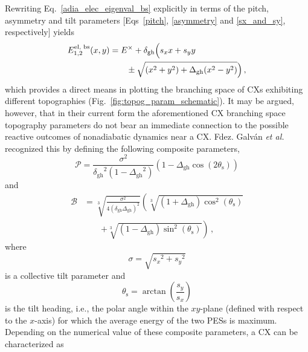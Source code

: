 \documentclass[9pt,bestpractices,pubversion]{livecoms}
\begin{document}
Rewriting Eq.~\eqref{adia_elec_eigenval_bs} explicitly in terms of the pitch, asymmetry and tilt parameters [Eqs~\eqref{pitch}, \eqref{asymmetry} and \eqref{sx_and_sy}, respectively] yields 
\begin{equation}
\label{adia_elec_eigenval_bs_topog_params}
\begin{split}
E_{1,2}^{\text{el, bs}}(x,y)
    &= E^\times + \delta_\text{gh}\Bigl(s_x x + s_y y \\
    &\qquad \pm \sqrt{(x^2 + y^2) + \Delta_\text{gh}(x^2 - y^2)}\Bigr)\, ,
\end{split}
\end{equation}
which provides a direct means in plotting the branching space of CXs exhibiting different topographies (Fig.~\ref{fig:topog_param_schematic}).
It may be argued, however, that in their current form the aforementioned CX branching space topography parameters do not bear an immediate connection to the possible reactive outcomes of nonadiabatic dynamics near a CX.\cite{wang2025minimum}
Fdez. Galv\'an \textit{et al.}\cite{fdez_galvan_analytical_2016, fdez_galvan_role_2022} recognized this by defining the following composite parameters,
\begin{equation}
\label{p_topog}
    \mathcal{P} = \frac{\sigma^2}{{\delta_{\text{gh}}}^2\left(1 - {\Delta_{\text{gh}}}^2\right)} \left(1 - \Delta_{\text{gh}} \cos(2\theta_\text{s})\right)
\end{equation}
and
\begin{equation}
\label{b_topog}
\begin{split}
\mathcal{B} &= \sqrt[3]{\frac{\sigma^2}{4\left(\delta_{\text{gh}}\Delta_{\text{gh}}\right)^2}}
\left(\sqrt[3]{\left(1 + \Delta_{\text{gh}}\right)\cos^2\left(\theta_\text{s}\right)} \right. \\
&\qquad\left. + \sqrt[3]{\left(1 - \Delta_{\text{gh}}\right)\sin^2\left(\theta_\text{s}\right)}\right) \, ,
\end{split}
\end{equation}
where 
\begin{equation}
\label{rel_tilt}
    \sigma = \sqrt{{s_x}^2 + {s_y}^2} 
\end{equation}
is a collective tilt parameter and
\begin{equation}
\label{tilt_heading}
    \theta_\text{s} = \arctan\left(\frac{s_y}{s_x}\right)
\end{equation}
is the tilt heading, i.e., the polar angle within the $xy$-plane (defined with respect to the $x$-axis) for which the average energy of the two PESs is maximum.
Depending on the numerical value of these composite parameters, a CX can be characterized as\cite{cuellar2023characterizing}
\end{document}
